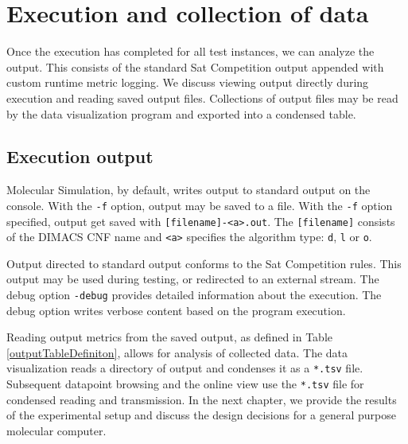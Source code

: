\FloatBarrier


	\section{Execution and collection of data}


Once the execution has completed for all test instances, we can analyze the output.  This consists of the standard {\sc Sat} Competition output appended with custom runtime metric logging.  We discuss viewing output directly during execution and reading saved output files.  Collections of output files may be read by the data visualization program and exported into a condensed table. 

		\subsection{Execution output}


	Molecular Simulation, by default, writes output to standard output on the console.  With the \texttt{-f} option, output may be saved to a file.  With the \texttt{-f} option specified, output get saved with \texttt{[filename]-<a>.out}.  The \texttt{[filename]} consists of the DIMACS CNF name and \texttt{<a>} specifies the algorithm type: \texttt{d}, \texttt{l} or \texttt{o}.


	Output directed to standard output conforms to the {\sc Sat} Competition rules.  This output may be used during testing, or redirected to an external stream.  The debug option \texttt{-debug} provides detailed information about the execution.  The debug option writes verbose content based on the program execution.  

	Reading output metrics from the saved output, as defined in Table \ref{outputTableDefiniton}, allows for analysis of collected data.  The data visualization reads a directory of output and condenses it as a \texttt{*.tsv} file.  Subsequent datapoint browsing and the online view use the \texttt{*.tsv} file for condensed reading and transmission.  In the next chapter, we provide the results of the experimental setup and discuss the design decisions for a general purpose molecular computer.  
